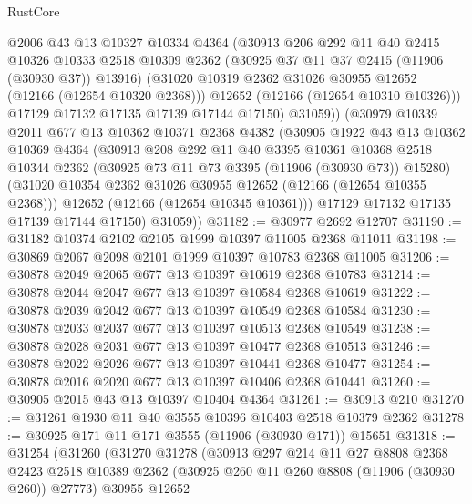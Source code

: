 \begin{lexlean}{RustCore}
\begin{coremodule}
            @2006
            @43
            @13
            @10327
            @10334
            @4364
            (@30913
              @206
              @292
              @11
              @40
              @2415
              @10326
              @10333
              @2518
              @10309
              @2362
              (@30925 @37 @11 @37 @2415 (@11906 (@30930 @37)) @13916)
              (@31020 @10319 @2362 @31026 @30955 @12652 (@12166 (@12654 @10320 @2368)))
              @12652
              (@12166 (@12654 @10310 @10326)))
            @17129
            @17132
            @17135
            @17139
            @17144
            @17150)
          @31059))
      (@30979
        @10339
        @2011
        @677
        @13
        @10362
        @10371
        @2368
        @4382
        (@30905
          @1922
          @43
          @13
          @10362
          @10369
          @4364
          (@30913
            @208
            @292
            @11
            @40
            @3395
            @10361
            @10368
            @2518
            @10344
            @2362
            (@30925 @73 @11 @73 @3395 (@11906 (@30930 @73)) @15280)
            (@31020 @10354 @2362 @31026 @30955 @12652 (@12166 (@12654 @10355 @2368)))
            @12652
            (@12166 (@12654 @10345 @10361)))
          @17129
          @17132
          @17135
          @17139
          @17144
          @17150)
        @31059))
@31182 := @30977 @2692 @12707
@31190 := @31182 @10374 @2102 @2105 @1999 @10397 @11005 @2368 @11011
@31198 := @30869 @2067 @2098 @2101 @1999 @10397 @10783 @2368 @11005
@31206 := @30878 @2049 @2065 @677 @13 @10397 @10619 @2368 @10783
@31214 := @30878 @2044 @2047 @677 @13 @10397 @10584 @2368 @10619
@31222 := @30878 @2039 @2042 @677 @13 @10397 @10549 @2368 @10584
@31230 := @30878 @2033 @2037 @677 @13 @10397 @10513 @2368 @10549
@31238 := @30878 @2028 @2031 @677 @13 @10397 @10477 @2368 @10513
@31246 := @30878 @2022 @2026 @677 @13 @10397 @10441 @2368 @10477
@31254 := @30878 @2016 @2020 @677 @13 @10397 @10406 @2368 @10441
@31260 := @30905 @2015 @43 @13 @10397 @10404 @4364
@31261 := @30913 @210
@31270 := @31261 @1930 @11 @40 @3555 @10396 @10403 @2518 @10379 @2362
@31278 := @30925 @171 @11 @171 @3555 (@11906 (@30930 @171)) @15651
@31318 := @31254
    (@31260
      (@31270
        @31278
        (@30913
          @297
          @214
          @11
          @27
          @8808
          @2368
          @2423
          @2518
          @10389
          @2362
          (@30925 @260 @11 @260 @8808 (@11906 (@30930 @260)) @27773)
          @30955
          @12652

\end{coremodule}
\end{lexlean}
